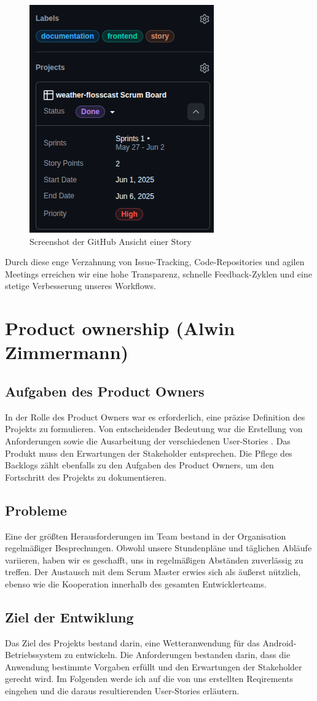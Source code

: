\documentclass{article}
\begin{document}
\begin{figure}[h]
  \caption{Screenshot der GitHub Ansicht einer Story}
  \centering
  \includegraphics[width=.3\textwidth]{overview.png}
\end{figure}

Durch diese enge Verzahnung von Issue-Tracking, Code-Repositories und agilen Meetings erreichen wir eine hohe Transparenz, schnelle Feedback-Zyklen und eine stetige Verbesserung unseres Workflows.

\section{Product ownership \small{(Alwin Zimmermann)}}
\subsection{Aufgaben des Product Owners}
In der Rolle des Product Owners war es erforderlich, eine präzise Definition des Projekts zu formulieren. Von entscheidender Bedeutung war die Erstellung von Anforderungen sowie die Ausarbeitung der verschiedenen User-Stories . Das Produkt muss den Erwartungen der Stakeholder entsprechen. Die Pflege des Backlogs zählt ebenfalls zu den Aufgaben des Product Owners, um den Fortschritt des Projekts zu dokumentieren.

\subsection{Probleme}
Eine der größten Herausforderungen im Team bestand in der Organisation regelmäßiger Besprechungen. Obwohl unsere Stundenpläne und täglichen Abläufe variieren, haben wir es geschafft, uns in regelmäßigen Abständen zuverlässig zu treffen. Der Austausch mit dem Scrum Master erwies sich als äußerst nützlich, ebenso wie die Kooperation innerhalb des gesamten Entwicklerteams.

\subsection{Ziel der Entwiklung}
Das Ziel des Projekts bestand darin, eine Wetteranwendung für das Android-Betriebssystem zu entwickeln. Die Anforderungen bestanden darin, dass die Anwendung bestimmte Vorgaben erfüllt und den Erwartungen der Stakeholder gerecht wird.
Im Folgenden werde ich auf die von uns erstellten Reqirements eingehen und die daraus resultierenden User-Stories erläutern.
\end{document}

